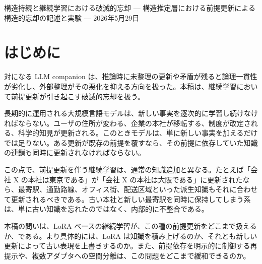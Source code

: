 \documentclass[12pt,a4paper]{article}
\begin{document}
\PaperTitleBlock
  {構造持続と継続学習における破滅的忘却}
  {— 構造推定層における前提更新による構造的忘却の記述と実験 —}
  {2026年5月29日}

\begin{abstract}
大規模言語モデルに新しい知識を逐次的に学習させると、古い知識が壊れることがある。しかし、すべての忘却が同じではない。ある前提が変わったとき、その前提に依存していた知識の連鎖がまとめて崩れる場合がある。本稿ではこれを構造的忘却と呼び、単一の事実の喪失と区別する。

7モデル（1.5B〜72B、4系統）で LoRA による逐次学習を行い、三つの条件を比較した。第一は過去の事実を再提示する基準条件（E-lite）、第二は前提の依存構造を追跡して選択的に再提示する条件（F-v2c）、第三は現在知識と過去知識を別々のアダプタに分離する条件（F-multi）である。全モデル・全条件で、最初の前提更新以降に旧知識の保持が急減した。LoRA は知識を積み上げるというより、上書きに近く振る舞う。前提依存を追跡して選択的に再提示すると依存整合性は改善するが、旧知識の保持忠実度は低いままである。多アダプタ分離は非ゼロの旧知識保持を与えるが、高忠実度の長期保持にはなお届かない。少なくとも本実験条件では、LoRA によるパラメータ更新だけでは依存知識の整合した再編を十分に担えないことが示される。
\end{abstract}

\section{はじめに}\label{ux306fux3058ux3081ux306b}

対になる LLM companion は、推論時に未整理の更新や矛盾が残ると論理一貫性が劣化し、外部整理がその悪化を抑える方向を扱った。本稿は、継続学習において前提更新が引き起こす破滅的忘却を扱う。

長期的に運用される大規模言語モデルは、新しい事実を逐次的に学習し続けなければならない。ユーザの住所が変わる、企業の本社が移転する、制度が改定される、科学的知見が更新される。このときモデルは、単に新しい事実を加えるだけでは足りない。ある更新が既存の前提を覆すなら、その前提に依存していた知識の連鎖も同時に更新されなければならない。

この点で、前提更新を伴う継続学習は、通常の知識追加と異なる。たとえば「会社 X の本社は東京である」が「会社 X の本社は大阪である」に更新されたなら、最寄駅、通勤路線、オフィス街、配送区域といった派生知識もそれに合わせて更新されるべきである。古い本社と新しい最寄駅を同時に保持してしまう系は、単に古い知識を忘れたのではなく、内部的に不整合である。

本稿の問いは、LoRA ベースの継続学習が、この種の前提更新をどこまで扱えるか、である。より具体的には、LoRA は知識を積み上げるのか、それとも新しい更新によって古い表現を上書きするのか。また、前提依存を明示的に制御する再提示や、複数アダプタへの空間分離は、この問題をどこまで緩和できるのか。
\end{document}
